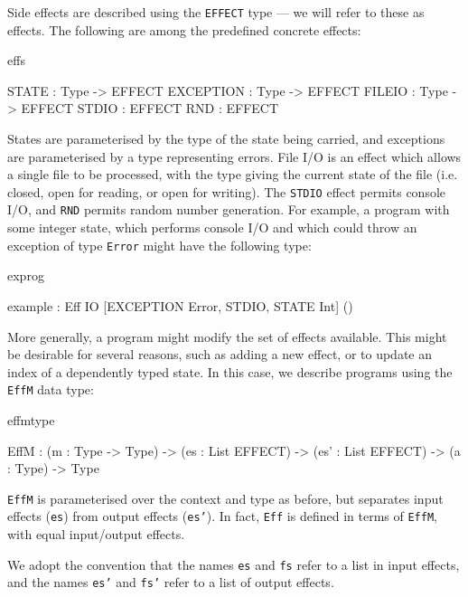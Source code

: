 Side effects are described using the \texttt{EFFECT} type --- we will refer
to these as  effects.  The following are 
among the predefined concrete effects:

\begin{SaveVerbatim}{effs}

STATE     : Type -> EFFECT
EXCEPTION : Type -> EFFECT
FILEIO    : Type -> EFFECT
STDIO     : EFFECT
RND       : EFFECT

\end{SaveVerbatim}

\noindent
States are parameterised by the type of the state being carried, and exceptions
are parameterised by a type representing errors. File I/O is an effect which
allows a single file to be processed, with the type giving the current state
of the file (i.e. closed, open for reading, or open for writing). The
\texttt{STDIO} effect permits console I/O, and \texttt{RND} permits random
number generation.
%
For example, a program with some integer state, which performs console I/O 
and which could throw
an exception of type \texttt{Error} might have the following type:

\noindent
\begin{SaveVerbatim}{exprog}

 example : Eff IO [EXCEPTION Error, STDIO, STATE Int] ()

\end{SaveVerbatim}

\noindent
More generally, a program might modify the set of effects available. This
might be desirable for several reasons, such as adding a new effect, or to
update an index of a dependently typed state. In this case, we describe
programs using the \texttt{EffM} data type:

\begin{SaveVerbatim}{effmtype}

EffM : (m   : Type -> Type) -> 
       (es  : List EFFECT) -> 
       (es' : List EFFECT) -> 
       (a   : Type) -> Type

\end{SaveVerbatim}

\noindent
\texttt{EffM} is parameterised over the context and type as before,
but separates input effects (\texttt{es}) from output effects (\texttt{es'}).
In fact, \texttt{Eff} is defined in terms of \texttt{EffM}, with equal
input/output effects.

We adopt the convention that the names \texttt{es} and \texttt{fs} refer to a list
in input effects, and the names \texttt{es'} and \texttt{fs'} refer to a list
of output effects.

